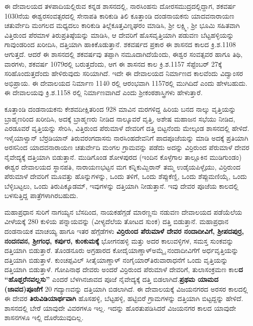 ಈ ದೇವಾಲಯದ ತಳಪಾದಿಯಲ್ಲಿರುವ ಕನ್ನಡ ಶಾಸನದಲ್ಲಿ, ನಾರಸಿಂಹನು ದೋರಸಮುದ್ರದಲ್ಲಿದ್ದಾಗ, ಶಕವರ್ಷ 1030ನೆಯ ಈಶ್ವರಸಂವತ್ಸರದಲ್ಲಿ ಸೇನಾಪತಿ ಕಾರಿಕುಡಿ ತಿಲಿ ಕೂತ್ತಾಂಡಿ ದಂಡನಾಯಕನು ಯಾದವನಾರಾಯಣ ಚತುರ್ವೇದಿ ಮಂಗಲದ ಮಧ್ಯದಲು ಕಾರಿಕುಡಿ ತಿಲ್ಲೆಕೂತ್ತವಿಣ್ನಘರಂ ಮಾಡಿಸಿ, ಶ‍್ರೀ ಲಕ್ಷ್ಮಿ, ಶ‍್ರೀ ಭೂಮಿ ಸಹಿತವಾಗಿ ವಿತ್ತಿರುಂದ ಪೆರಮಾಳ ತಿರುಪ್ರತಿಷ್ಠೆಯನ್ನು ಮಾಡಿಸಿ, ಆ ದೇವರಿಗೆ ಹೊಸವೃತ್ತಿಯಾಗಿ ಪಡುವಣ ಬೆಟ್ಟಹಳ್ಳಿಯನ್ನು ಗಾವುಂಡರಿಂದ ಖರೀದಿಸಿ, ದತ್ತಿಯಾಗಿ ಹಾಕಿಕೊಡುತ್ತಾನೆ. ಶಕವರ್ಷದ ಪ್ರಕಾರ ಈ ಶಾಸನದ ಕಾಲದ ಕ್ರಿ.ಶ.1108 ಆಗುತ್ತದೆ. ಆದರೆ ಈ ಶಾಸನದಲ್ಲಿ ಶಕವರ್ಷವು ತಪ್ಪಾಗಿ ನಮೂದಾಗಿದೆಯೆಂದು, ಈಶ್ವರ ಸಂವತ್ಸವರ ಹಾಗೂ ತಿಥಿ, ವಾರಗಳು, ಶಕವರ್ಷ 1079ರಲ್ಲಿ ಬರುತ್ತದೆಂದು, ಆಗ ಈ ಶಾಸನದ ಕಾಲ ಕ್ರಿ.ಶ.1157 ಸೆಪ್ಟೆಂಬರ್​ 27ಕ್ಕೆ ಸರಿಹೊಂದುತ್ತದೆಂದು ಹೇಳಿರುವುದು ಸರಿಯಾಗಿದೆ. ಇದೇ ಈ ದೇವಾಲಯದ ನಿರ್ಮಾಣದ ಕಾಲವೆಂದು ವಿದ್ವಾಂಸರ ಅಭಿಪ್ರಾಯ. ಈ ದೇವಾಲಯದ ನಿರ್ಮಾಣ 1140 ರಲ್ಲಿ ಆರಂಭವಾಗಿ 1157ರಲ್ಲಿ ಮುಗಿದಿದೆ ಎಂದು ಹೇಳಬಹುದು. ಈ ದೇವಾಲಯವು ಕ್ರಿ.ಶ.1158 ರಲ್ಲಿ ನಿರ್ಮಾಣವಾಗಿದೆ ಎಂದು ಶ‍್ರೀಕಂಠಶಾಸ್ತ್ರಿಗಳು ಹೇಳುತ್ತಾರೆ.

ಕೂತ್ತಾಂಡಿ ದಂಡನಾಯಕನು ಕೇಶವದೀಕ್ಷಿತರಿಂದ 928 ಮಾವಿನ ಮರಗಳಿದ್ದ ಹಿರಿಯ ಬನದ ನಾಲ್ಕು ವೃತ್ತಿಯನ್ನು ಬ್ರಾಹ್ಮಣರಿಂದ ಖರೀದಿಸಿ, ಅದಕ್ಕೆ ಬ್ರಾಹ್ಮಣರು ನೀಡಿದ ನಾಲ್ಕೂವರೆ ವೃತ್ತಿ, ಅಶೇಷ ಮಹಾಜನ ಸಭೆಯು ನೀಡಿದ, ಎರಡೂವರೆ ವೃತ್ತಿಯನ್ನು ಸೇರಿಸಿ, ವಿತ್ತಿರುಂದ ಪೆರುಮಾಳೆ ದೇವರಿಗೆ ದತ್ತಿ ಬಿಟ್ಟನೆಂದು ಮೇಲ್ಕಂಡ ಶಾಸನದಲ್ಲಿ ಹೇಳಿದೆ. ಇಳೈಯಾಳ್ವಾನ್​ ಬೆರ್ರಡಿಯಾನ್​ ತಿರುವರಂಗದಾಸನು ನಾರಸಿಂಹದೇವನಿಗೆ ಪಾದಪೂಜೆಯನ್ನು ಮಾಡಿ ಅದಕ್ಕೆ ಪ್ರತಿಯಾಗಿ ಅರಸನಿಂದ ಯಾದವನಾರಾಯಣ ಚತುರ್ವೇದಿ ಮಂಗಲ ಗ್ರಾಮವನ್ನು ಪಡೆದು ಅದನ್ನು ವಿರ್ರಿರುಂದ ಪೆರುಮಾಳೆ ದೇವರ ನೈವೇದ್ಯಕ್ಕೆ ದತ್ತಿಯಾಗಿ ಬಿಡುತ್ತಾನೆ. ಮುಡಿಗೊಂಡ ಶೋಳಪುರದ (ಇಂದಿನ ಕೊಳ್ಳೆಗಾಲ ತಾಲ್ಲೂಕಿನ ಮುಡಿಗುಂಡಂ) ಈಶ್ವರ ದೇವಾಲಯದ ಸ್ಥಾನಪತಿ, ನಾರಾಯಣಭಟ್ಟನ ಮಗ ಕನ್ನಿಕುಮ್ಬಿರಾನ್​ ತಮ್ಮ ಉಡೈಯಪಿಳ್ಳೈಯು, ವಿರ್ರಿರುಂದ ಪೆರುಮಾಳೆ ದೇವರಿಗೆ ಮೂವತ್ತು ಹೊನ್ನುಗಳನ್ನು, ಒಂದು ತಳಿಗೆ, ಒಂದು ಶೆಪ್ಪುಕೆಣ್ಡಿ, ಒಂದು ಶೆಪ್ಪುಮಣಿಯೈ, ಒಂದು ಬೆಳ್ಳಿಬಟ್ಟಲು, ಒಂದು ತಿರುಪಿಕ್ಕೂಡಮ್, ಇವುಗಳನ್ನು ದತ್ತಿಯಾಗಿ ನೀಡುತ್ತಾನೆ. ಇವು ದೇವರ ಪೂಜೆಯ ಕಾಲದಲ್ಲಿ ಬಳಸುತ್ತಿದ್ದ ಪಾತ್ರೆಗಳಾಗಿರಬಹುದು.

ಮಹಾಪ್ರಧಾನ ಸುರಿಗೆ ನಾಗಯ್ಯನ ಬೆಸದಿಂದ, ನಾಯಕಹೆಗ್ಗಡೆ ಮಾರಣ್ಣನು ನಡುವಣ ದೇವಾಲಯದ ಪಡೆಯೆಲೆಯ ವೀಳೆಯಕ್ಕೆ 280 ಕುಳಿಯ ಪನ್ನಾಯವನ್ನು (ವೀಳ್ಯದೆಲೆಯ ತೋಟದ ಸುಂಕ) ದತ್ತಿ ಬಿಡುತ್ತಾನೆ. ಮಹಾಪ್ರಧಾನ ದಂಡನಾಯಕ ಮಾಚಯ್ಯ ಹಾಗೂ ಇತರ ಹೆಗ್ಗೆಡೆಗಳು \textbf{ವಿರ್ರಿರುಂದ ಪೆರುಮಾಳೆ ದೇವರ ನಂದಾದೀವಿಗೆ, ಶ‍್ರೀಪದಪುರ್ರ, ನಂದನವನ, ಶ‍್ರೀಗಂಧ, ಕರ್ಪುರ, ಕುಂಕುಮಕ್ಕೆ }ಭೋಗನಹಳ್ಳಿ ಮತ್ತು ಅದರ ಕಾಲುವಳ್ಳಿಗಳ, ಸಮಸ್ತ ಸುಂಕವನ್ನು ದತ್ತಿಯಾಗಿ ಬಿಡುತ್ತಾರೆ. ತೊಂಡನೂರು ಅಗ್ರಹಾರದ ಕೋದೈಯಾಣ್ಡಾಳ್​ಅಮ್ಮೈ ನಂದಾದೀವಿಗೆಗೆ ಅರ್ಧವೃತ್ತಿಯನ್ನು ದತ್ತಿಯಾಗಿ ಬಿಡುತ್ತಾಳೆ. ಕುಂಚಪ್ಪವಿಲ್​ ಸೀತೈಯಾಣ್ಡಾಳ್​ ನಂಗೈಯಾರ್​ ತಿರುವಾರಾಧನೆಗೆ ಒಂದು ವೃತ್ತಿಯನ್ನು ದತ್ತಿಯಾಗಿ ಬಿಡುತ್ತಾಳೆ. ಗೋಪಿನಾಥ ದೇವರು ಅಂದರೆ ವಿರ್ರಿರುಂದ ಪೆರುಮಾಳೆ ದೇವರಿಗೆ, ತುಲಾಸಂಕ್ರಮಣ ಕಾಲ\textbf{ದ “ಹೊಥ್ತರೆನವಲ್ಲಸು”} ಎಂದರೆ ಬೆಳಗಿನಜಾವದ ಪೂಜೆ ನೈವೇದ್ಯಕ್ಕೆ ದತ್ತಿ ಬಿಡಲಾಗಿದೆ.\textbf{ಪ್ರಥಮ ಯಾಮದ (ಜಾವದ)ಪೂಜೆಗೆ} 20 ಗದ್ಯಾಣವನ್ನು ದತ್ತಿಯಾಗಿ ಬಿಡಲಾಗಿದೆ. ಈ ದೇವಾಲಯಕ್ಕೆ ವಿಜಯನಗರದ ಅರಸರ ಕಾಲದಲ್ಲಿ ಈ ದೇವರ \textbf{ತಿರುವಿಡಿಯಾರ್ಥವಾಗಿ} ಹೊಸಹಳ್ಳಿ, ಬೆಟ್ಟಹಳ್ಳಿ, ಹಟ್ಟಿಬಿರೆ ಗ್ರಾಮಗಳನ್ನು ದತ್ತಿಯಾಗಿ ಬಿಟ್ಟದ್ದನ್ನು ಹೇಳಿದೆ. ಶಾಸನದಲ್ಲಿ ಬೇರೆ ಯಾವುದೇ ವಿವರಗಳೂ ಇಲ್ಲ. ಇದನ್ನು ಹೊರತುಪಡಿಸಿದರೆ ವಿಜಯನಗರ ಕಾಲದ ಯಾವುದೇ ಶಾಸನಗಳೂ ಇಲ್ಲಿ ದೊರೆಯುವುದಿಲ್ಲ.

